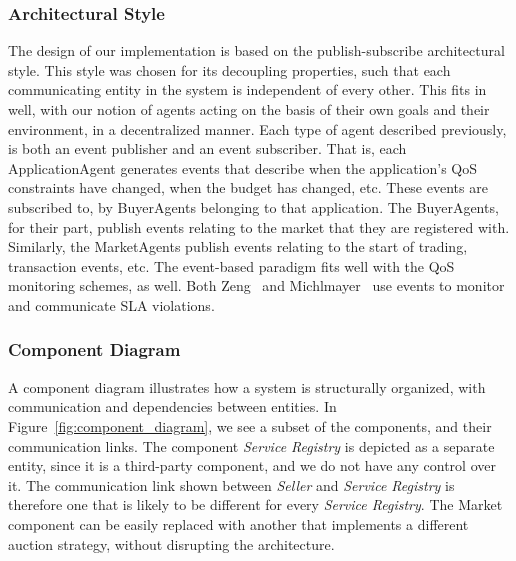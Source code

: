 \documentclass[10pt,journal,compsoc]{IEEEtran}
\begin{document}
\subsubsection{Architectural Style} The design of our implementation is based on the publish-subscribe architectural style. This style was chosen for its decoupling properties, such that each communicating entity in the system is independent of every other. This fits in well, with our notion of agents acting on the basis of their own goals and their environment, in a decentralized manner. Each type of agent described previously, is both an event publisher and an event subscriber. That is, each ApplicationAgent generates events that describe when the application's QoS constraints have changed, when the budget has changed, etc. These events are subscribed to, by BuyerAgents belonging to that application. The BuyerAgents, for their part, publish events relating to the market that they are registered with. Similarly, the MarketAgents publish events relating to the start of trading, transaction events, etc. The event-based paradigm fits well with the QoS monitoring schemes, as well. Both Zeng~\cite{Zeng2007Monitoring} and Michlmayer~\cite{Michlmayr2009Comprehensive} use events to monitor and communicate SLA violations. 
%

\subsubsection{Component Diagram} A component diagram illustrates how a system is structurally organized, with communication and dependencies between entities. In Figure~\ref{fig:component_diagram}, we see a subset of the components, and their communication links. The component \textit{Service Registry} is depicted as a separate entity, since it is a third-party component, and we do not have any control over it. The communication link shown between \textit{Seller} and \textit{Service Registry} is therefore one that is likely to be different for every \textit{Service Registry}. The Market component can be easily replaced with another that implements a different auction strategy, without disrupting the architecture.
\end{document}
